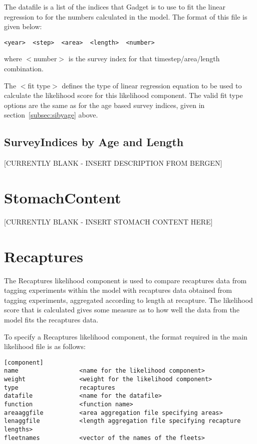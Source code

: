 \documentclass [a4paper, 10pt]{book}
\begin{document}
The datafile is a list of the indices that Gadget is to use to fit the linear regression to for the numbers calculated in the model.  The format of this file is given below:

{\small\begin{verbatim}
<year>  <step>  <area>  <length>  <number>
\end{verbatim}}

where $<$number$>$ is the survey index for that timestep/area/length combination.

\bigskip
The $<$fit type$>$ defines the type of linear regression equation to be used to calculate the likelihood score for this likelihood component.  The valid fit type options are the same as for the age based survey indices, given in section~\ref{subsec:sibyage} above.

\subsection{SurveyIndices by Age and Length}\label{subsec:sibyageandlength}
[CURRENTLY BLANK - INSERT DESCRIPTION FROM BERGEN]

\section{StomachContent}\label{sec:stomach}
[CURRENTLY BLANK - INSERT STOMACH CONTENT HERE]

\section{Recaptures}\label{sec:recaptures}
The Recaptures likelihood component is used to compare recaptures data from tagging experiments within the model with recaptures data obtained from tagging experiments, aggregated according to length at recapture.  The likelihood score that is calculated gives some measure as to how well the data from the model fits the recaptures data.

\bigskip
To specify a Recaptures likelihood component, the format required in the main likelihood file is as follows:

{\small\begin{verbatim}
[component]
name                 <name for the likelihood component>
weight               <weight for the likelihood component>
type                 recaptures
datafile             <name for the datafile>
function             <function name>
areaaggfile          <area aggregation file specifying areas>
lenaggfile           <length aggregation file specifying recapture lengths>
fleetnames           <vector of the names of the fleets>
\end{verbatim}}
\end{document}
